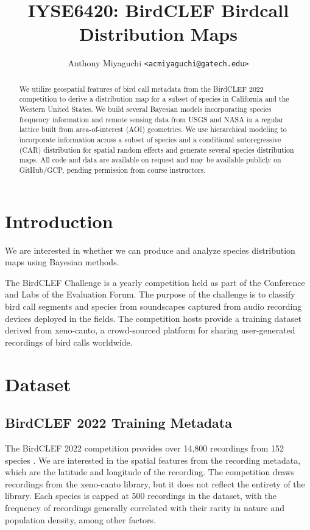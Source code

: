 \documentclass[notitlepage]{article}
\title{IYSE6420: BirdCLEF Birdcall Distribution Maps}
\author{
    Anthony Miyaguchi \texttt{<acmiyaguchi@gatech.edu>}
}
\begin{document}
\maketitle
\thispagestyle{empty}

\begin{abstract}

We utilize geospatial features of bird call metadata from the BirdCLEF 2022 competition to derive a distribution map for a subset of species in California and the Western United States.
We build several Bayesian models incorporating species frequency information and remote sensing data from USGS and NASA in a regular lattice built from area-of-interest (AOI) geometries. 
We use hierarchical modeling to incorporate information across a subset of species and a conditional autoregressive (CAR) distribution for spatial random effects and generate several species distribution maps.
All code and data are available on request and may be available publicly on GitHub/GCP, pending permission from course instructors.

\end{abstract}

\section{Introduction}

We are interested in whether we can produce and analyze species distribution maps using Bayesian methods.

The BirdCLEF Challenge is a yearly competition held as part of the Conference and Labs of the Evaluation Forum.
The purpose of the challenge is to classify bird call segments and species from soundscapes captured from audio recording devices deployed in the fields.
The competition hosts provide a training dataset derived from xeno-canto, a crowd-sourced platform for sharing user-generated recordings of bird calls worldwide.

\section{Dataset}
\subsection{BirdCLEF 2022 Training Metadata}

The BirdCLEF 2022 competition provides over 14,800 recordings from 152 species \cite{kahl2022overview}.
We are interested in the spatial features from the recording metadata, which are the latitude and longitude of the recording.
The competition draws recordings from the xeno-canto library, but it does not reflect the entirety of the library.
Each species is capped at 500 recordings in the dataset, with the frequency of recordings generally correlated with their rarity in nature and population density, among other factors.
\end{document}
